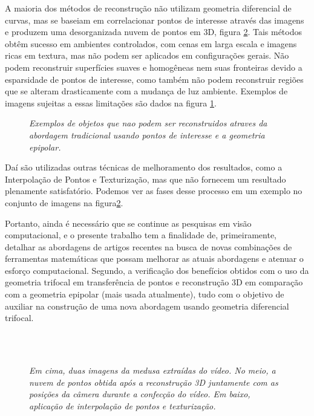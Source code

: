 A maioria dos métodos de reconstrução não utilizam geometria diferencial de curvas, mas se baseiam em correlacionar pontos de interesse através das imagens e produzem uma desorganizada nuvem de pontos em 3D, figura \ref{fig.medusa}. Tais métodos obtêm sucesso em ambientes controlados, com cenas em larga escala e imagens ricas em textura, mas não podem ser aplicados em configurações gerais. Não podem reconstruir superfícies suaves e homogêneas nem suas fronteiras devido a esparsidade de pontos de interesse, como também não podem reconstruir regiões que se alteram drasticamente com a mudança de luz ambiente. Exemplos de imagens sujeitas a essas limitações são dados na figura \ref{fig.carro-objeto-curvo}.
\begin{figure}[!htb]
\centering
{}
\quad
{}
\caption{{\it Exemplos de objetos que nao podem ser reconstruidos atraves da abordagem tradicional usando pontos de interesse e a geometria epipolar.}}
\label{fig.carro-objeto-curvo}
\end{figure}  
Daí são utilizadas outras técnicas de melhoramento dos resultados, como a Interpolação de Pontos e Texturização, mas que não fornecem um resultado plenamente satisfatório. Podemos ver as fases desse processo em um exemplo no conjunto de imagens na figura\ref{fig.medusa}.

Portanto, ainda é necessário que se continue as pesquisas em visão computacional, e o presente trabalho tem a finalidade de, primeiramente, detalhar as abordagens de artigos recentes na busca de novas combinações de ferramentas matemáticas que possam melhorar as atuais abordagens e atenuar o esforço computacional. Segundo, a verificação dos benefícios obtidos com o uso da geometria trifocal em transferência de pontos e reconstrução 3D em comparação com a geometria epipolar (mais usada atualmente), tudo com o objetivo de auxiliar na construção de uma nova abordagem usando geometria diferencial trifocal.

\begin{figure}[!htb]
\centering
{}
\quad
{}
\\
\quad
{}
\\
\quad
{}
\caption{{\it Em cima, duas imagens da medusa extraídas do vídeo. No meio, a nuvem de pontos obtida após a reconstrução 3D juntamente com as posições da câmera durante a confecção do vídeo. Em baixo, aplicação de interpolação de pontos e texturização.}}
\label{fig.medusa}
\end{figure}

